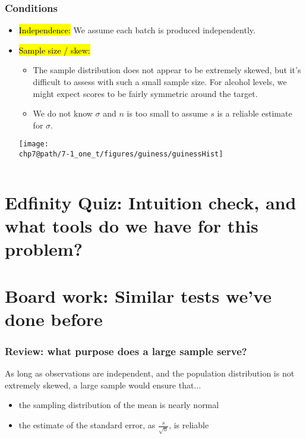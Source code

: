 \documentclass[slidestop,compress,mathserif]{beamer}
\makeatletter
\def\chp7@path{../../Chp 7}
\makeatother
\begin{document}
\begin{frame}
\frametitle{Conditions}

\begin{itemize}
\item \hl{Independence:} We assume each batch is produced independently.
\pause
\item \hl{Sample size / skew:} $\:$ \\
\pause{}
{
{\tiny
\begin{itemize}
\item The sample distribution does not appear to be extremely skewed, but it's difficult to assess with such a small sample size. For alcohol levels, we might expect scores to be fairly symmetric around the target.
\item We do not know $\sigma$ and $n$ is too small to assume $s$ is a reliable estimate for $\sigma$.
\end{itemize}
}
}
{
\texttt{[image: \\chp7@path/7-1\_one\_t/figures/guiness/guinessHist]}
}
\end{itemize}
$\:$ \\
\pause
{}
\end{frame}


\section{Edfinity Quiz: Intuition check, and what tools do we have for this problem?}


\section{Board work: Similar tests we've done before}


\begin{frame}
\frametitle{Review: what purpose does a large sample serve?}

As long as observations are independent, and the population distribution is not extremely skewed, a large sample would ensure that...

\begin{itemize}

\item the sampling distribution of the mean is nearly normal

\item the estimate of the standard error, as $\frac{s}{\sqrt{n}}$, is reliable

\end{itemize}

\end{frame}
\end{document}
